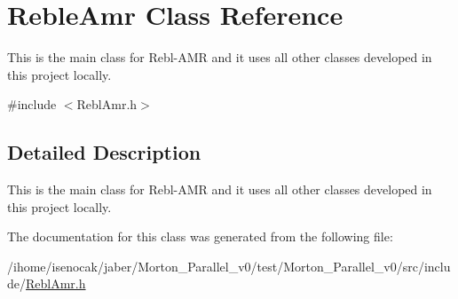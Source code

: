 \hypertarget{classRebleAmr}{}\section{Reble\+Amr Class Reference}
\label{classRebleAmr}


This is the main class for Rebl-\/\+A\+MR and it uses all other classes developed in this project locally.  




{\ttfamily \#include $<$Rebl\+Amr.\+h$>$}



\subsection{Detailed Description}
This is the main class for Rebl-\/\+A\+MR and it uses all other classes developed in this project locally. 

The documentation for this class was generated from the following file\+:\begin{DoxyCompactItemize}
\item 
/ihome/isenocak/jaber/\+Morton\+\_\+\+Parallel\+\_\+v0/test/\+Morton\+\_\+\+Parallel\+\_\+v0/src/include/\mbox{\hyperlink{ReblAmr_8h}{Rebl\+Amr.\+h}}\end{DoxyCompactItemize}
